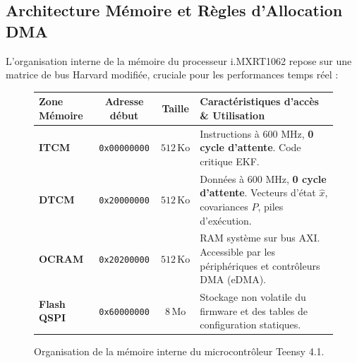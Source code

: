 \documentclass[../Materiel.tex]{subfiles}
\begin{document}
\subsection{Architecture Mémoire et Règles d'Allocation DMA}

L'organisation interne de la mémoire du processeur i.MXRT1062 repose sur une matrice de bus Harvard modifiée, cruciale pour les performances temps réel :

\begin{figure}[htbp]
\centering
\small
\begin{tabular}{|l|c|c|p{7.5cm}|}
\hline
\textbf{Zone Mémoire} & \textbf{Adresse début} & \textbf{Taille} & \textbf{Caractéristiques d'accès \& Utilisation} \\
\hline
\textbf{ITCM} & \texttt{0x00000000} & $512\,\text{Ko}$ & Instructions à 600 MHz, \textbf{0 cycle d'attente}. Code critique EKF. \\
\textbf{DTCM} & \texttt{0x20000000} & $512\,\text{Ko}$ & Données à 600 MHz, \textbf{0 cycle d'attente}. Vecteurs d'état $\hat{x}$, covariances $P$, piles d'exécution. \\
\textbf{OCRAM} & \texttt{0x20200000} & $512\,\text{Ko}$ & RAM système sur bus AXI. Accessible par les périphériques et contrôleurs DMA (eDMA). \\
\textbf{Flash QSPI} & \texttt{0x60000000} & $8\,\text{Mo}$ & Stockage non volatile du firmware et des tables de configuration statiques. \\
\hline
\end{tabular}
\caption{Organisation de la mémoire interne du microcontrôleur Teensy 4.1.}
\label{tab:teensy41_memory}
\end{figure}
\end{document}
